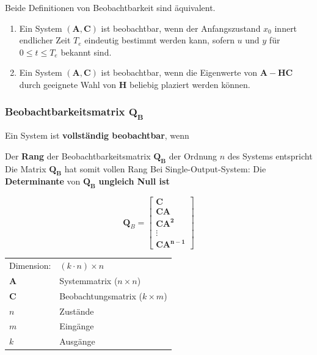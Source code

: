 Beide Definitionen von Beobachtbarkeit sind äquivalent.

\smallskip

\begin{enumerate}
    \item Ein System $(\bm{A}, \bm{C})$ ist beobachtbar, wenn der Anfangszustand $x_0$ innert endlicher
        Zeit $T_e$ eindeutig bestimmt werden kann, sofern $u$ und $y$ für $0 \leq t \leq T_e$ bekannt sind.
    \item Ein System $(\bm{A}, \bm{C})$ ist beobachtbar, wenn die Eigenwerte von $\bm{A} - \bm{HC}$ durch geeignete
        Wahl von $\bm{H}$ beliebig plaziert werden können.
\end{enumerate}



\subsubsection{Beobachtbarkeitsmatrix $\bm{Q_B}$}
\label{Beobachtbarkeitsmatrix}

Ein System ist \textbf{vollständig beobachtbar}, wenn

\begin{outline}
    \1 Der \textbf{Rang} der Beobachtbarkeitsmatrix $\bm{Q_B}$ der Ordnung $n$ des Systems entspricht
        \2 Die Matrix $\bm{Q_B}$ hat somit vollen Rang
    \1 Bei Single-Output-System:  Die \textbf{Determinante} von $\bm{Q_B}$ \textbf{ungleich Null ist}
\end{outline}

\smallskip

\begin{minipage}[c]{0.4\columnwidth}
    $$
    \bm{Q}_B = 
    \begin{bmatrix}
        \bm{C} \\ \bm{C A} \\ \bm{C A^2} \\ \vdots \\ \bm{C A^{n-1}} 
    \end{bmatrix}
    $$
\end{minipage}
\hfill
\begin{minipage}[c]{0.58\columnwidth}
    \begin{tabular}{ll}
        Dimension:  & $(k \cdot n) \times n$ \\
        $\bm{A}$    & Systemmatrix ($n \times n$) \\
        $\bm{C}$    & Beobachtungsmatrix ($k \times m$) \\
        $n$         & Zustände \\
        $m$         & Eingänge \\
        $k$         & Ausgänge 
    \end{tabular}
\end{minipage}


